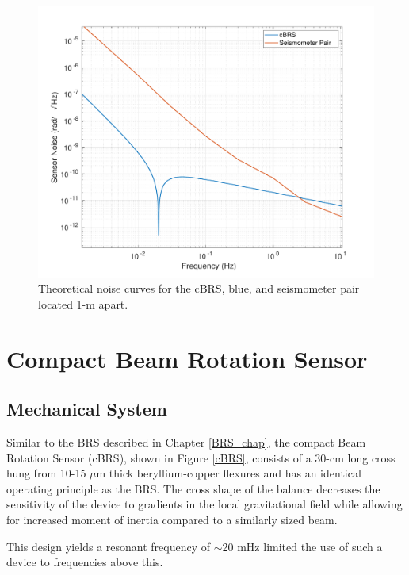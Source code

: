 \documentclass [12pt, proquest]{uwthesis}[2019]
\begin{document}
\begin{figure}%
\begin{center}
\includegraphics[width=\textwidth]{SensorNoise.pdf}
\caption{Theoretical noise curves for the cBRS, blue, and seismometer pair located 1-m apart.}
\label{sensNoise}
\end{center}
\end{figure}


\section{Compact Beam Rotation Sensor} \label{cBRSSec}
\subsection{Mechanical System}

Similar to the BRS described in Chapter \ref{BRS_chap}, the compact Beam Rotation Sensor (cBRS), shown in Figure \ref{cBRS}, consists of a 30-cm long cross hung from 10-15 $\mu$m thick beryllium-copper flexures and has an identical operating principle as the BRS. The cross shape of the balance decreases the sensitivity of the device to gradients in the local gravitational field while allowing for increased moment of inertia compared to a similarly sized beam. 

This design yields a resonant frequency of $\sim$20 mHz limited the use of such a device to frequencies above this. 
\end{document}
